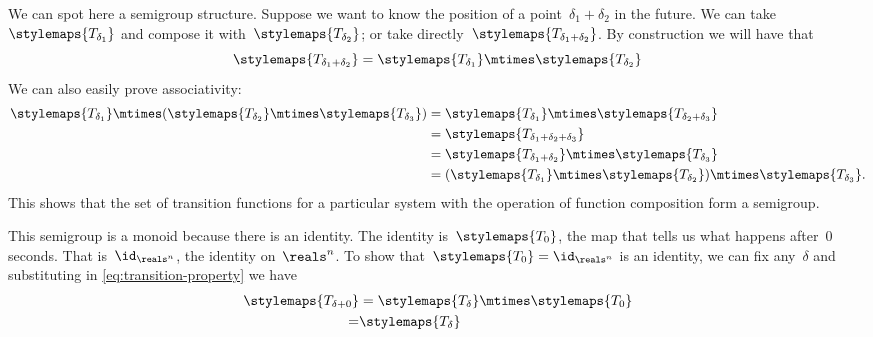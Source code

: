 \begin{example}
    We can spot here a semigroup structure.
    Suppose we want to know the position of a point~$\delta_1 + \delta_2$
    in the future.
    We can take~$\stylemaps{T_{\delta_1}}$ and compose it with~$\stylemaps{T_{\delta_2}}$; or take directly~$\stylemaps{T_{\delta_1 + \delta_2}}$.
    By construction we will have that
    \begin{equation}
        \label{eq:transition-property}
        \stylemaps{T_{\delta_1 + \delta_2}} = \stylemaps{T_{\delta_1}} \mtimes \stylemaps{T_{\delta_2}}
    \end{equation}
    We can also easily prove associativity:
    \begin{equation}
        \begin{aligned}
            \stylemaps{T_{\delta_1}}\mtimes (\stylemaps{T_{\delta_2}}\mtimes \stylemaps{T_{\delta_3}})&=\stylemaps{T_{\delta_1}}\mtimes \stylemaps{T_{\delta_2+\delta_3}}\\
            &=\stylemaps{T_{\delta_1+\delta_2+\delta_3}}\\
            &=\stylemaps{T_{\delta_1+\delta_2}}\mtimes \stylemaps{T_{\delta_3}}\\
            &=(\stylemaps{T_{\delta_1}}\mtimes \stylemaps{T_{\delta_2}})\mtimes \stylemaps{T_{\delta_3}}.
        \end{aligned}
    \end{equation}
    This shows that the set of transition functions for a particular system with the operation of function composition form a semigroup.
    
    This semigroup is a monoid because there is an identity.
    The identity is~$\stylemaps{T_0}$, the map that tells us what happens after~$0$ seconds.
    That is~$\id_{\reals^n}$, the identity on~$\reals^n$.
    To show that~$\stylemaps{T_0} = \id_{\reals^n}$ is an identity, we can fix any~$\delta$ and substituting in \cref{eq:transition-property} we have
    \begin{equation*}
        \begin{aligned}
            \stylemaps{T_{\delta + 0}}&= \stylemaps{T_{\delta}} \mtimes \stylemaps{T_{0}} \\
            = & \stylemaps{T_{\delta}}
        \end{aligned}
    \end{equation*}

\end{example}


